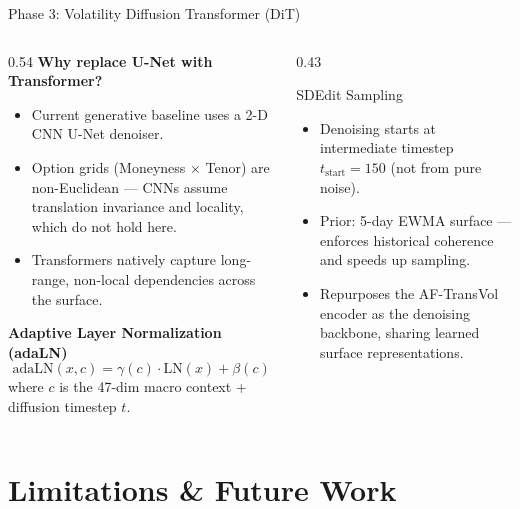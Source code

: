 \documentclass[aspectratio=169,10pt]{beamer}
\begin{document}
\begin{frame}{Phase 3: Volatility Diffusion Transformer (DiT)}
  \begin{columns}[T]
    \begin{column}{0.54\textwidth}
      \textbf{Why replace U-Net with Transformer?}
      \begin{itemize}\itemsep4pt
        \item Current generative baseline uses a 2-D CNN U-Net denoiser.
        \item Option grids (Moneyness $\times$ Tenor) are non-Euclidean --- CNNs assume translation invariance and locality, which do not hold here.
        \item Transformers natively capture long-range, non-local dependencies across the surface.
      \end{itemize}
      \vspace{4pt}
      \textbf{Adaptive Layer Normalization (adaLN)}
      \[
        \text{adaLN}(x,c)=\gamma(c)\cdot\mathrm{LN}(x)+\beta(c)
      \]
      where $c$ is the 47-dim macro context + diffusion timestep $t$.
    \end{column}
    \begin{column}{0.43\textwidth}
      \begin{block}{SDEdit Sampling}
        \footnotesize
        \begin{itemize}\itemsep3pt
          \item Denoising starts at intermediate timestep $t_\text{start}=150$ (not from pure noise).
          \item Prior: 5-day EWMA surface --- enforces historical coherence and speeds up sampling.
          \item Repurposes the AF-TransVol encoder as the denoising backbone, sharing learned surface representations.
        \end{itemize}
      \end{block}
    \end{column}
  \end{columns}
\end{frame}

\section{Limitations \& Future Work}
\end{document}
